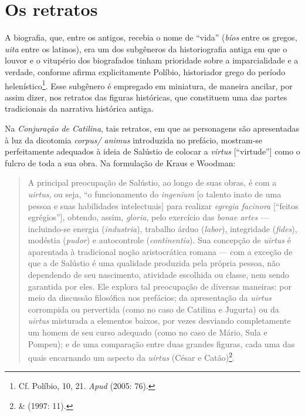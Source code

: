\section{Os retratos}

A biografia, que, entre os antigos, recebia o nome de “vida” (\emph{bíos} entre
os gregos, \emph{uita} entre os latinos), era um dos subgêneros da
historiografia antiga em que o louvor e o vitupério dos biografados tinham
prioridade sobre a imparcialidade e a verdade, conforme afirma explicitamente
Políbio, historiador grego do período helenístico\footnote{ Cf. Políbio, 10, 21. \emph{Apud}  (2005: 76).}. 
Esse subgênero é empregado em miniatura, de maneira ancilar, por assim dizer, nos retratos das
figuras históricas, que constituem uma das partes tradicionais da narrativa
histórica antiga.

Na \emph{Conjuração de Catilina}, tais retratos, em que as personagens são
apresentadas à luz da dicotomia \emph{corpus/ animus} introduzida no prefácio,
mostram-se perfeitamente adequados à ideia de Salústio de colocar a
\emph{virtus} [“virtude”] como o fulcro de toda a sua obra. Na formulação de
Kraus e Woodman:

\begin {quote}

A principal preocupação de Salústio, ao longo de suas obras, é com a
\emph{uirtus}, ou seja, “o funcionamento do \emph{ingenium} [o talento inato de
uma pessoa e suas habilidades intelectuais] para realizar \emph{egregia
facinora} [“feitos egrégios”], obtendo, assim, \emph{gloria}, pelo exercício das
\emph{bonae artes} --- incluindo-se energia (\emph{industria}), trabalho árduo
(\emph{labor}), integridade (\emph{fides}), modéstia (\emph{pudor}) e
autocontrole (\emph{continentia}). Sua concepção de \emph{uirtus }é aparentada
à tradicional noção aristocrática romana --- com a exceção de que a de Salústio
é uma qualidade produzida pela própria pessoa, não dependendo de seu
nascimento, atividade escolhida ou classe, nem sendo garantida por eles. Ele
explora tal preocupação de diversas maneiras: por meio da discussão filosófica
nos prefácios; da apresentação da \emph{uirtus} corrompida ou pervertida (como
no caso de Catilina e Jugurta) ou da \emph{uirtus} misturada a elementos
baixos, por vezes desviando completamente um homem de seu curso adequado (como
no caso de Mário, Sula e Pompeu); e de uma comparação entre duas grandes
figuras, cada uma das quais encarnando um aspecto da \emph{uirtus} (César e Catão)\footnote{ \& (1997: 11).}.

\end{quote}

